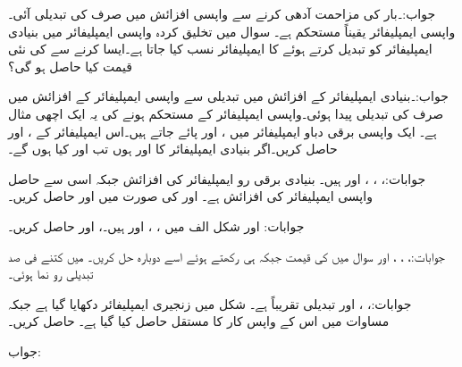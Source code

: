 جواب:۔بار کی مزاحمت آدھی کرنے سے واپسی افزائش میں صرف  کی تبدیلی آئی۔واپسی ایمپلیفائر یقیناً مستحکم ہے۔
سوال  میں تخلیق کردہ واپسی ایمپلیفائر میں بنیادی ایمپلیفائر کو تبدیل کرتے ہوئے  کا ایمپلیفائر  نسب کیا جاتا ہے۔ایسا کرنے سے  کی نئی قیمت کیا حاصل ہو گی؟

جواب:۔بنیادی ایمپلیفائر کے افزائش میں  تبدیلی سے واپسی ایمپلیفائر کے افزائش میں صرف  کی تبدیلی پیدا ہوئی۔واپسی ایمپلیفائر کے مستحکم ہونے کی یہ ایک اچھی مثال ہے۔
ایک واپسی برقی دباو ایمپلیفائر میں ،  اور  پائے جاتے ہیں۔اس ایمپلیفائر کے ،  اور  حاصل کریں۔اگر بنیادی ایمپلیفائر کا  اور  ہوں تب  اور  کیا ہوں گے۔

جوابات:، ، ،  اور  ہیں۔
بنیادی برقی رو ایمپلیفائر کی افزائش  جبکہ اسی سے حاصل واپسی ایمپلیفائر کی افزائش  ہے۔ اور  کی صورت میں  اور  حاصل کریں۔

جوابات: اور 
شکل  الف میں ، ،  اور  ہیں۔،  اور  حاصل کریں۔

جوابات:، ، ،  اور 
سوال  میں  کی قیمت  جبکہ  ہی رکھتے ہوئے اسے دوبارہ حل کریں۔ میں کتنے فی صد تبدیلی رو نما ہوئی۔

جوابات:، ،  اور تبدیلی تقریباً   ہے۔
شکل  میں زنجیری ایمپلیفائر دکھایا گیا ہے جبکہ مساوات  میں اس کے واپس کار کا مستقل  حاصل کیا گیا ہے۔ حاصل کریں۔

جواب: 

